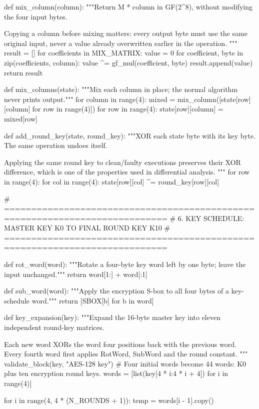 \begin{lightcode}[numbers=left,firstnumber=1]
def mix_column(column):
    """Return M * column in GF(2^8), without modifying the four input bytes.

    Copying a column before mixing matters: every output byte must use the same
    original input, never a value already overwritten earlier in the operation.
    """
    result = []
    for coefficients in MIX_MATRIX:
        value = 0
        for coefficient, byte in zip(coefficients, column):
            value ^= gf_mul(coefficient, byte)
        result.append(value)
    return result


def mix_columns(state):
    """Mix each column in place; the normal algorithm never prints output."""
    for column in range(4):
        mixed = mix_column([state[row][column] for row in range(4)])
        for row in range(4):
            state[row][column] = mixed[row]


def add_round_key(state, round_key):
    """XOR each state byte with its key byte. The same operation undoes itself.

    Applying the same round key to clean/faulty executions preserves their XOR
    difference, which is one of the properties used in differential analysis.
    """
    for row in range(4):
        for col in range(4):
            state[row][col] ^= round_key[row][col]


# ============================================================================
# 6. KEY SCHEDULE: MASTER KEY K0 TO FINAL ROUND KEY K10
# ============================================================================


def rot_word(word):
    """Rotate a four-byte key word left by one byte; leave the input unchanged."""
    return word[1:] + word[:1]


def sub_word(word):
    """Apply the encryption S-box to all four bytes of a key-schedule word."""
    return [SBOX[b] for b in word]


def key_expansion(key):
    """Expand the 16-byte master key into eleven independent round-key matrices.

    Each new word XORs the word four positions back with the previous word.
    Every fourth word first applies RotWord, SubWord and the round constant.
    """
    validate_block(key, "AES-128 key")
    # Four initial words become 44 words: K0 plus ten encryption round keys.
    words = [list(key[4 * i:4 * i + 4]) for i in range(4)]

    for i in range(4, 4 * (N_ROUNDS + 1)):
        temp = words[i - 1].copy()


\end{lightcode}
